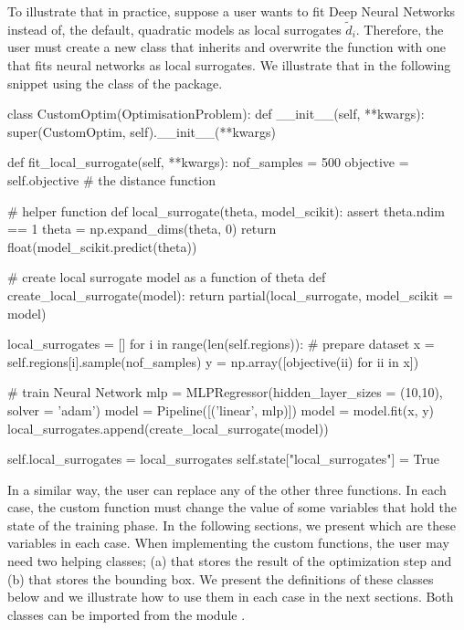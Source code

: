\documentclass[article]{jss}
\begin{document}
To illustrate that in practice, suppose a user wants to fit Deep
Neural Networks instead of, the default, quadratic models as local
surrogates \(\tilde{d}_i\). Therefore, the user must create a new
class that inherits  and overwrite the
 function with one that fits
neural networks as local surrogates. We illustrate that in the
following snippet using the  class
of the  package.

\begin{Code}
class CustomOptim(OptimisationProblem):
    def __init__(self, **kwargs):
        super(CustomOptim, self).__init__(**kwargs)

    def fit_local_surrogate(self, **kwargs):
        nof_samples = 500
        objective = self.objective # the distance function

        # helper function
        def local_surrogate(theta, model_scikit):
            assert theta.ndim == 1
            theta = np.expand_dims(theta, 0)
            return float(model_scikit.predict(theta))

        # create local surrogate model as a function of theta
        def create_local_surrogate(model):
            return partial(local_surrogate, model_scikit = model)

        local_surrogates = []
        for i in range(len(self.regions)):
            # prepare dataset
            x = self.regions[i].sample(nof_samples)
            y = np.array([objective(ii) for ii in x])

            # train Neural Network
            mlp = MLPRegressor(hidden_layer_sizes = (10,10), solver = 'adam')
            model = Pipeline([('linear', mlp)])
            model = model.fit(x, y)
            local_surrogates.append(create_local_surrogate(model))

        self.local_surrogates = local_surrogates
        self.state["local_surrogates"] = True
\end{Code}

In a similar way, the user can replace any of the other three
functions. In each case, the custom function must change the value of
some variables that hold the state of the training phase. In the
following sections, we present which are these variables in each case.
When implementing the custom functions, the user may need two helping
classes; (a)  that stores the result of
the optimization step and (b)  that stores the
bounding box. We present the definitions of these classes below and we
illustrate how to use them in each case in the next sections. Both
classes can be imported from the module
.
\end{document}
